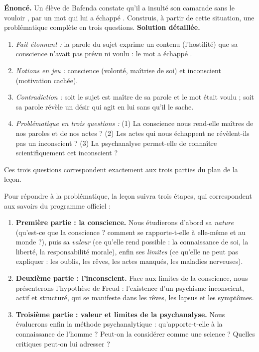 \documentclass[11pt]{article}
\newcounter{popsec}
\newcounter{popsub}
\newcommand{\courssub}[1]{%
  \stepcounter{popsub}%
  \par\vspace{9pt}\noindent{\popxbold\fontsize{11.5}{13}\selectfont\color{popink}{\color{poporange}\thepopsec.\thepopsub}\hspace{6pt}#1}\par\nopagebreak\vspace{4pt}
}
\begin{document}
\begin{exoresolu}
\textbf{Énoncé.} Un élève de Bafenda constate qu'il a insulté son camarade \og sans le vouloir \fg{}, par un mot qui lui a \og échappé \fg. Construis, à partir de cette situation, une problématique complète en trois questions.
\tcblower
\textbf{Solution détaillée.}
\begin{enumerate}
\item \emph{Fait étonnant :} la parole du sujet exprime un contenu (l'hostilité) que sa conscience n'avait pas prévu ni voulu : le mot a \og échappé \fg.
\item \emph{Notions en jeu :} conscience (volonté, maîtrise de soi) et inconscient (motivation cachée).
\item \emph{Contradiction :} soit le sujet est maître de sa parole et le mot était voulu ; soit sa parole révèle un désir qui agit en lui sans qu'il le sache.
\item \emph{Problématique en trois questions :} (1) La conscience nous rend-elle maîtres de nos paroles et de nos actes ? (2) Les actes qui nous échappent ne révèlent-ils pas un inconscient ? (3) La psychanalyse permet-elle de connaître scientifiquement cet inconscient ?
\end{enumerate}
Ces trois questions correspondent exactement aux trois parties du plan de la leçon.
\end{exoresolu}

\courssub{Annonce du plan}

Pour répondre à la problématique, la leçon suivra trois étapes, qui correspondent aux savoirs du programme officiel :

\begin{enumerate}
\item \textbf{Première partie : la conscience.} Nous étudierons d'abord sa \emph{nature} (qu'est-ce que la conscience ? comment se rapporte-t-elle à elle-même et au monde ?), puis sa \emph{valeur} (ce qu'elle rend possible : la connaissance de soi, la liberté, la responsabilité morale), enfin ses \emph{limites} (ce qu'elle ne peut pas expliquer : les oublis, les rêves, les actes manqués, les maladies nerveuses).
\item \textbf{Deuxième partie : l'inconscient.} Face aux limites de la conscience, nous présenterons l'hypothèse de Freud : l'existence d'un psychisme inconscient, actif et structuré, qui se manifeste dans les rêves, les lapsus et les symptômes.
\item \textbf{Troisième partie : valeur et limites de la psychanalyse.} Nous évaluerons enfin la méthode psychanalytique : qu'apporte-t-elle à la connaissance de l'homme ? Peut-on la considérer comme une science ? Quelles critiques peut-on lui adresser ?
\end{enumerate}
\end{document}
